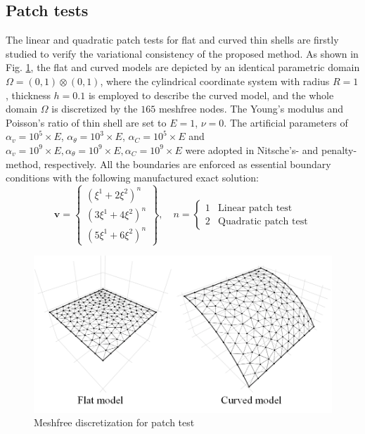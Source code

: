 \subsection{Patch tests}
The linear and quadratic patch tests for flat and curved thin shells are firstly studied to verify the variational consistency of the proposed method. As shown in Fig. \ref{ptf1}, the flat and curved models are depicted by an identical parametric domain $\Omega = (0,1)\otimes(0,1)$, where the cylindrical coordinate system with radius $R=1$, thickness $h=0.1$ is employed to describe the curved model, and the whole domain $\Omega$ is discretized by the $165$ meshfree nodes. The Young's modulus and Poisson's ratio of thin shell are set to $E=1$, $\nu=0$. The artificial parameters of $\alpha_v=10^5\times E$, $\alpha_\theta=10^3\times E$, $\alpha_C=10^5\times E$ and $\alpha_v=10^9\times E, \alpha_\theta=10^9\times E, \alpha_C=10^9\times E$ were adopted in Nitsche's- and penalty- method, respectively. All the boundaries are enforced as essential boundary conditions with the following manufactured exact solution:
\begin{equation}
\boldsymbol v = \begin{Bmatrix}
(\xi^1+2\xi^2)^n \\ (3\xi^1+4\xi^2)^n \\ (5\xi^1+6\xi^2)^n
\end{Bmatrix},\quad
n = \begin{cases}
1 & \text{Linear patch test} \\
2 & \text{Quadratic patch test}
\end{cases}
\end{equation}

\begin{figure}[!ht]
    \centering
    \includegraphics[width=\textwidth]{figures/ptmsh}
    \caption{Meshfree discretization for patch test}\label{ptf1}
\end{figure}

